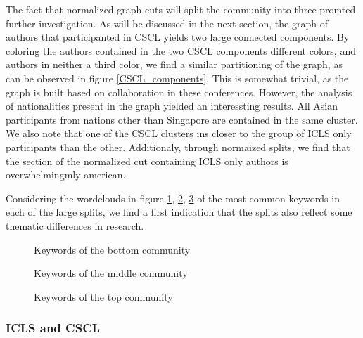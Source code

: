 \documentclass[article,twocolumn]{IEEEtran}
\begin{document}
The fact that normalized graph cuts will split the community into three
promted further investigation. As will be discussed in the next section,
the graph of authors that participanted in CSCL yields two large
connected components. By coloring the authors contained in the two CSCL
components different colors, and authors in neither a third color, we
find a similar partitioning of the graph, as can be observed in figure
\ref{CSCL_components}. This is somewhat trivial, as the graph is built
based on collaboration in these conferences. However, the analysis of
nationalities present in the graph yielded an interessting results. All
Asian participants from nations other than Singapore are contained in
the same cluster. We also note that one of the CSCL clusters ins closer
to the group of ICLS only participants than the other. Additionaly,
through normaized splits, we find that the section of the normalized cut
containing ICLS only authors is overwhelmingmly american.

Considering the wordclouds in figure \ref{c1}, \ref{c2}, \ref{c3} of the
most common keywords in each of the large splits, we find a first
indication that the splits also reflect some thematic differences in
research.


    \begin{figure}
        \begin{center}\end{center}
        \caption{Keywords of the bottom community}
        \label{c1}
    \end{figure}
    

    \begin{figure}
        \begin{center}\end{center}
        \caption{Keywords of the middle community}
        \label{c2}
    \end{figure}
    

    \begin{figure}
        \begin{center}\end{center}
        \caption{Keywords of the top community}
        \label{c3}
    \end{figure}
    
    \hypertarget{icls-and-cscl}{%
\subsubsection{ICLS and CSCL}\label{icls-and-cscl}}
\end{document}
